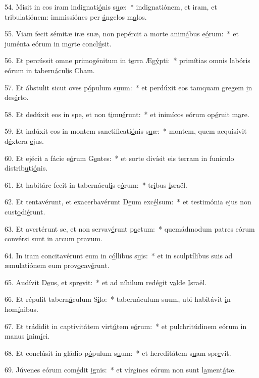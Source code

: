 54. Misit in eos iram indignati\uline{ó}nis s\uline{u}æ:~* indignatiónem, et iram, et tribulatiónem: immissiónes per \uline{á}ngelos m\uline{a}los.\par 
55. Viam fecit sémitæ iræ suæ, non pepércit a morte anim\uline{á}bus e\uline{ó}rum:~* et juménta eórum in m\uline{o}rte concl\uline{ú}sit.\par 
56. Et percússit omne primogénitum in t\uline{e}rra Æg\uline{ý}pti:~* primítias omnis labóris eórum in tabern\uline{á}cul\uline{i}s Cham.\par 
57. Et ábstulit sicut oves p\uline{ó}pulum s\uline{u}um:~* et perdúxit eos tamquam gregem \uline{i}n des\uline{é}rto.\par 
58. Et dedúxit eos in spe, et non t\uline{i}mu\uline{é}runt:~* et inimícos eórum op\uline{é}ruit m\uline{a}re.\par 
59. Et indúxit eos in montem sanctificati\uline{ó}nis s\uline{u}æ:~* montem, quem acquisívit d\uline{é}xtera \uline{e}jus.\par 
60. Et ejécit a fácie e\uline{ó}rum G\uline{e}ntes:~* et sorte divísit eis terram in funículo distrib\uline{u}ti\uline{ó}nis.\par 
61. Et habitáre fecit in tabernácul\uline{i}s e\uline{ó}rum:~* tr\uline{i}bus \uline{I}sraël.\par 
62. Et tentavérunt, et exacerbavérunt D\uline{e}um exc\uline{é}lsum:~* et testimónia ejus non cust\uline{o}di\uline{é}runt.\par 
63. Et avertérunt se, et non servav\uline{é}runt p\uline{a}ctum:~* quemádmodum patres eórum convérsi sunt in \uline{a}rcum pr\uline{a}vum.\par 
64. In iram concitavérunt eum in c\uline{ó}llibus s\uline{u}is:~* et in sculptílibus suis ad æmulatiónem eum prov\uline{o}cav\uline{é}runt.\par 
65. Audívit D\uline{e}us, et spr\uline{e}vit:~* et ad níhilum redégit v\uline{a}lde \uline{I}sraël.\par 
66. Et répulit tabern\uline{á}culum S\uline{i}lo:~* tabernáculum suum, ubi habitávit \uline{i}n hom\uline{í}nibus.\par 
67. Et trádidit in captivitátem virt\uline{ú}tem e\uline{ó}rum:~* et pulchritúdinem eórum in manus \uline{i}nim\uline{í}ci.\par 
68. Et conclúsit in gládio p\uline{ó}pulum s\uline{u}um:~* et hereditátem s\uline{u}am spr\uline{e}vit.\par 
69. Júvenes eórum com\uline{é}dit \uline{i}gnis:~* et vírgines eórum non sunt l\uline{a}ment\uline{á}tæ.\par 
